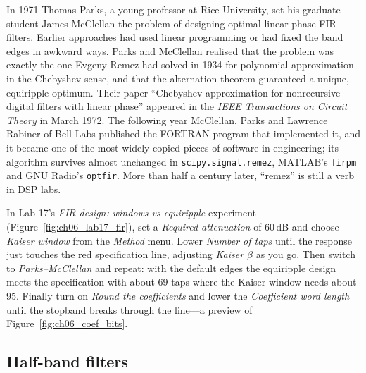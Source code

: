 \begin{history}
In 1971 Thomas Parks, a young professor at Rice University, set his graduate student James McClellan
the problem of designing optimal linear-phase FIR filters. Earlier approaches had used linear
programming or had fixed the band edges in awkward ways. Parks and McClellan realised that the
problem was exactly the one Evgeny Remez had solved in 1934 for polynomial approximation in the
Chebyshev sense, and that the alternation theorem guaranteed a unique, equiripple optimum. Their
paper ``Chebyshev approximation for nonrecursive digital filters with linear phase'' appeared in
the \emph{IEEE Transactions on Circuit Theory} in March 1972. The following year McClellan, Parks
and Lawrence Rabiner of Bell Labs published the FORTRAN program that implemented it, and it
became one of the most widely copied pieces of software in engineering; its algorithm survives
almost unchanged in \texttt{scipy.signal.remez}, MATLAB's \texttt{firpm} and GNU Radio's
\texttt{optfir}. More than half a century later, ``remez'' is still a verb in DSP labs.
\end{history}

\begin{tryit}
In Lab 17's \emph{FIR design: windows vs equiripple} experiment (Figure~\ref{fig:ch06_lab17_fir}), set a \emph{Required attenuation} of
60\,dB and choose \emph{Kaiser window} from the \emph{Method} menu. Lower \emph{Number of taps} until
the response just touches the red specification line, adjusting \emph{Kaiser $\beta$} as you go.
Then switch to \emph{Parks--McClellan} and repeat: with the default edges the equiripple design meets
the specification with about 69 taps where the Kaiser window needs about 95. Finally turn on
\emph{Round the coefficients} and lower the \emph{Coefficient word length} until the stopband breaks
through the line---a preview of Figure~\ref{fig:ch06_coef_bits}.
\end{tryit}


\subsection{Half-band filters}

